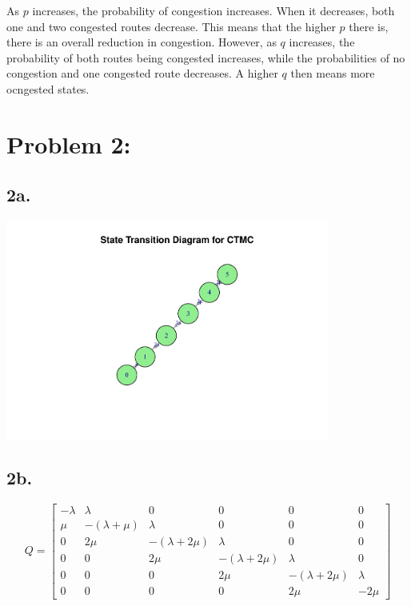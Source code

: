 \documentclass[12pt]{article}
\begin{document}
As $p$ increases, the probability of congestion increases. When it decreases, both one and two congested routes decrease. This means that the higher $p$ there is, there is an overall reduction in congestion. However, as $q$ increases, the probability of both routes being congested increases, while the probabilities of no congestion and one congested route decreases. A higher $q$ then means more ocngested states. 

\section*{Problem 2:}

\subsection*{2a.}

\begin{center}
    \includegraphics[width=0.8\textwidth]{project2_2a.pdf}
\end{center}

\subsection*{2b.}

\[
Q =
\begin{bmatrix}
-\lambda & \lambda & 0 & 0 & 0 & 0 \\
\mu & -(\lambda + \mu) & \lambda & 0 & 0 & 0 \\
0 & 2\mu & -(\lambda + 2\mu) & \lambda & 0 & 0 \\
0 & 0 & 2\mu & -(\lambda + 2\mu) & \lambda & 0 \\
0 & 0 & 0 & 2\mu & -(\lambda + 2\mu) & \lambda \\
0 & 0 & 0 & 0 & 2\mu & -2\mu
\end{bmatrix}
\]
\end{document}

